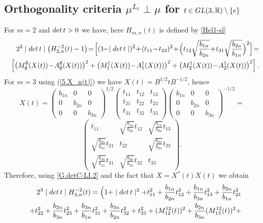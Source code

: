 \documentclass[preprint,12pt]{elsarticle}
\numberwithin{equation}{section}
\begin{document}
\subsection{Orthogonality criteria  $\mu^{L_t}\perp \mu$ for $t\in {\rm GL}(3,\mathbb R)\setminus\{e\}$}
%
For $m=2$ and ${\rm det}\,t>0$ we have,
%
here $H_{m,n}(t)$ is defined by \eqref{Hel1-sl}
%
{\small
\begin{eqnarray*}
&& 
2^2\mid{\rm det}\,t\mid\big(H_{2,n}^{-2}(t)-1\big)\!=\!\Big[(1\!-\!\mid{\rm
det}\,t\mid)^2\!+\!
(t_{11}\!-\!t_{22})^2\!+\!\Big(t_{12}\sqrt{\frac{b_{1n}}{b_{2n}}}\!+\!
t_{21}\sqrt{\frac{b_{2n}}{b_{1n}}}\Big)^2\Big]\!=\\
&&
\left[\big(M^\emptyset_\emptyset(X(t))\!-\!A^\emptyset_\emptyset(X(t))\big)^2+
\big(M^1_1(X(t))\!-\!A^1_1(X(t))\big)^2+\big(M^1_2(X(t))\!-\!A^1_2(X(t))\big)^2
\right].
\end{eqnarray*}
}
%
For $m=3$  using (\ref{5.X_n(t)}) we have $X(t)=B^{1/2}tB^{-1/2}$, hence
$$
X(t)=
 \left(\begin{array}{ccc}
 b_{1n}&0&0\\
 0&b_{2n}&0\\
 0&0&b_{3n}
\end{array}\right)^{1/2}\!\!
 \left(\begin{array}{ccc}
 t_{11}&t_{12}&t_{13}\\
 t_{21}&t_{22}&t_{23}\\
 t_{31}&t_{32}&t_{33}\\
\end{array}\right)
 \left(\begin{array}{ccc}
b_{1n}&0&0\\
 0&b_{2n}&0\\
 0&0&b_{3n}
\end{array}\right)^{-1/2}=\!\!
$$
$$
 \left(\begin{array}{ccc}
 t_{11}&\sqrt{ \frac{b_{1n}}{ b_{2n}}}t_{12}&\sqrt{ \frac{b_{1n}}{b_{3n}}}t_{13}\\
 \sqrt{ \frac{b_{2n}}{ b_{1n}}}t_{21}&t_{22}&\sqrt{ \frac{b_{2n}}{ b_{3n}}}t_{23}\\
\sqrt{ \frac{b_{3n}}{ b_{1n}}}t_{31}& \sqrt{ \frac{b_{3n}}{ b_{2n}}}t_{32}&t_{33}
\end{array}\right).
$$
Therefore, using  
\eqref{G.detC-LI.2}
%
and the fact that $X=X^*(t)X(t)$ we obtain
\begin{eqnarray*}
 &&2^3\mid{\rm det}\,t\mid H_{3,n}^{-2}(t)=\Big(1+\mid{\rm
det}\,t\mid^2+t_{11}^2
+\frac{b_{1n}}{b_{2n}}t_{12}^2+\frac{b_{1n}}{b_{3n}}t_{13}^2+\frac{b_{2n}}{b_{1n}}t_{21}^2\\
&&+t_{22}^2+\frac{b_{2n}}{b_{3n}}t_{23}^2+
\frac{b_{3n}}{b_{1n}}t_{31}^2+\frac{b_{3n}}{b_{2n}}t_{32}^2+t_{33}^2+ 
(M^{12}_{12}(t))^2+\frac{b_{2n}}{b_{3n}}(M^{12}_{13}(t))^2+
\end{eqnarray*}
\end{document}
